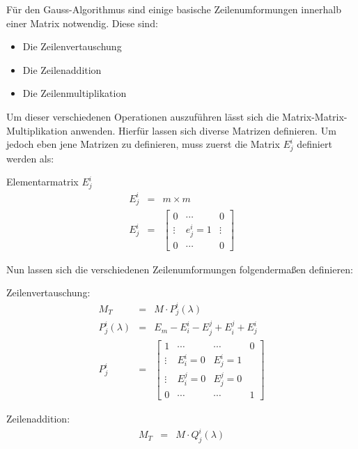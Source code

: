 
Für den Gauss-Algorithmus sind einige basische Zeilenumformungen innerhalb einer Matrix notwendig. Diese sind:

\begin{itemize}
\item Die Zeilenvertauschung
\item Die Zeilenaddition
\item Die Zeilenmultiplikation
\end{itemize}

Um dieser verschiedenen Operationen auszuführen lässt sich die Matrix-Matrix-Multiplikation anwenden. Hierfür lassen sich diverse Matrizen definieren.
Um jedoch eben jene Matrizen zu definieren, muss zuerst die Matrix $E^i_j$ definiert werden als:

\begin{Def} Elementarmatrix $E^i_j$
\begin{eqnarray}
	E^i_j &=& m \times m \\
 	E^i_j &=& 
	 	\begin{bmatrix}
	 	0 & \cdots & 0 \\
	 	\vdots & e^i_j = 1 & \vdots \\
	 	0 & \cdots & 0 
 	\end{bmatrix}
\end{eqnarray}
\end{Def}

Nun lassen sich die verschiedenen Zeilenumformungen folgendermaßen definieren:

\begin{Def} Zeilenvertauschung:
\begin{eqnarray}
	M_T &=& M \cdot P_j^i(\lambda) \\
	P_j^i(\lambda) &=& E_m - E^i_i - E^j_j + E^j_i + E^i_j \\
	P^i_j &=& \begin{bmatrix}
	1 & \cdots & \cdots & 0 \\ 
	\vdots & E^i_i = 0 & E^i_j = 1 &  \\ 
	\vdots & E^j_i = 0 & E^j_j = 0 &  \\ 
	0 & \cdots & \cdots & 1
	\end{bmatrix} 
\end{eqnarray}
\end{Def}

\begin{Def} Zeilenaddition:
\begin{eqnarray}
M_T &=& M \cdot Q^i_j(\lambda) 
\end{eqnarray}
\end{Def}